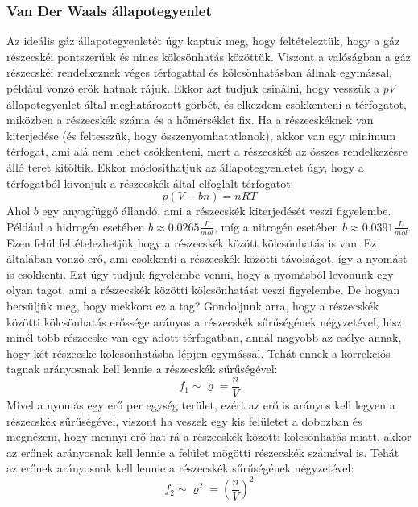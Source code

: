 \documentclass[../main.tex]{subfiles}
\begin{document}
\subsubsection*{Van Der Waals állapotegyenlet}
Az ideális gáz állapotegyenletét úgy kaptuk meg, hogy feltételeztük, hogy a gáz részecskéi pontszerűek és nincs kölcsönhatás közöttük. Viszont a valóságban a gáz részecskéi rendelkeznek véges térfogattal és kölcsönhatásban állnak
egymással, például vonzó erők hatnak rájuk. Ekkor azt tudjuk csinálni, hogy vesszük a $pV$ állapotegyenlet által meghatározott görbét, és elkezdem csökkenteni a térfogatot, miközben a részecskék száma és a hőmérséklet fix.
Ha a részecskéknek van kiterjedése (és feltesszük, hogy összenyomhatatlanok), akkor van egy minimum térfogat, ami alá nem lehet csökkenteni, mert a részecskét az összes rendelkezésre álló teret kitöltik.
Ekkor módosíthatjuk az állapotegyenletet úgy, hogy a térfogatból kivonjuk a részecskék által elfoglalt térfogatot:
\begin{equation}
    p (V - b n) = n R T
\end{equation}
Ahol $b$ egy anyagfüggő állandó, ami a részecskék kiterjedését veszi figyelembe. Például a hidrogén esetében $b \approx 0.0265 \frac{L}{mol}$, míg a nitrogén esetében $b \approx 0.0391 \frac{L}{mol}$.
Ezen felül feltételezhetjük hogy a részecskék között kölcsönhatás is van. Ez általában vonzó erő, ami csökkenti a részecskék közötti távolságot, így a nyomást is csökkenti.
Ezt úgy tudjuk figyelembe venni, hogy a nyomásból levonunk egy olyan tagot, ami a részecskék közötti kölcsönhatást veszi figyelembe. De hogyan becsüljük meg, hogy mekkora ez a tag?
Gondoljunk arra, hogy a részecskék közötti kölcsönhatás erőssége arányos a részecskék sűrűségének négyzetével, hisz minél több részecske van egy adott térfogatban, annál nagyobb az esélye annak, hogy két részecske kölcsönhatásba lépjen egymással.
Tehát ennek a korrekciós tagnak arányosnak kell lennie a részecskék sűrűségével:
\begin{equation}
    f_1 \sim \varrho = \frac{n}{V}
\end{equation}
Mivel a nyomás egy erő per egység terület, ezért az erő is arányos kell legyen a részecskék sűrűségével, viszont ha veszek egy kis felületet a dobozban és megnézem, hogy mennyi erő hat rá a részecskék közötti kölcsönhatás miatt, akkor az erőnek arányosnak kell lennie a felület mögötti részecskék számával is. Tehát az erőnek arányosnak kell lennie a részecskék sűrűségének négyzetével:
\begin{equation}
    f_2 \sim \varrho^2 = \left(\frac{n}{V}\right)^2
\end{equation}
\end{document}
